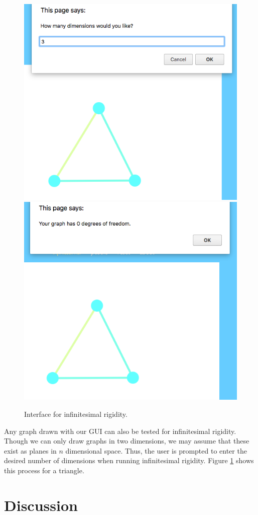 \documentclass[aps,prd,final,twocolumn,letterpaper,nofootinbib]{revtex4-1}
\begin{document}
\begin{figure}[ht]
   \centering
   \includegraphics[width=.49\linewidth]{img/i1}
   \includegraphics[width=.49\linewidth]{img/i2}
   \caption{Interface for infinitesimal rigidity.}
   \label{fig:inf}
\end{figure}

Any graph drawn with our GUI can also be tested for infinitesimal rigidity.
Though we can only draw graphs in two dimensions,
we may assume that these exist as planes in $n$ dimensional space.
Thus, the user is prompted to enter the desired number of dimensions
when running infinitesimal rigidity.
Figure \ref{fig:inf} shows this process for a triangle.

\section{Discussion}
\end{document}
